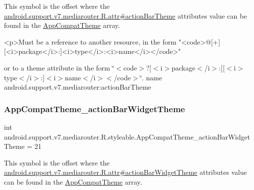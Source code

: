 This symbol is the offset where the \hyperlink{classandroid_1_1support_1_1v7_1_1mediarouter_1_1R_1_1attr_a06445938d30d959fab5c0651b8961488}{android.\+support.\+v7.\+mediarouter.\+R.\+attr\#action\+Bar\+Theme} attribute\textquotesingle{}s value can be found in the \hyperlink{classandroid_1_1support_1_1v7_1_1mediarouter_1_1R_1_1styleable_a4e3d3900c75d49aeb2f283cac00214d6}{App\+Compat\+Theme} array.

\begin{DoxyVerb}      <p>Must be a reference to another resource, in the form "<code>@[+][<i>package</i>:]<i>type</i>:<i>name</i></code>"
\end{DoxyVerb}
 or to a theme attribute in the form \char`\"{}$<$code$>$?\mbox{[}$<$i$>$package$<$/i$>$\+:\mbox{]}\mbox{[}$<$i$>$type$<$/i$>$\+:\mbox{]}$<$i$>$name$<$/i$>$$<$/code$>$\char`\"{}.  name android.\+support.\+v7.\+mediarouter\+:action\+Bar\+Theme \mbox{\label{classandroid_1_1support_1_1v7_1_1mediarouter_1_1R_1_1styleable_ae736ca88412d41362ebb97ce89f3bdbf}} 
\subsubsection{\texorpdfstring{App\+Compat\+Theme\+\_\+action\+Bar\+Widget\+Theme}{AppCompatTheme\_actionBarWidgetTheme}}
{\footnotesize\ttfamily int android.\+support.\+v7.\+mediarouter.\+R.\+styleable.\+App\+Compat\+Theme\+\_\+action\+Bar\+Widget\+Theme = 21\hspace{0.3cm}{\ttfamily [static]}}

This symbol is the offset where the \hyperlink{classandroid_1_1support_1_1v7_1_1mediarouter_1_1R_1_1attr_a30c01c594c458f768506beeede0d3133}{android.\+support.\+v7.\+mediarouter.\+R.\+attr\#action\+Bar\+Widget\+Theme} attribute\textquotesingle{}s value can be found in the \hyperlink{classandroid_1_1support_1_1v7_1_1mediarouter_1_1R_1_1styleable_a4e3d3900c75d49aeb2f283cac00214d6}{App\+Compat\+Theme} array.

